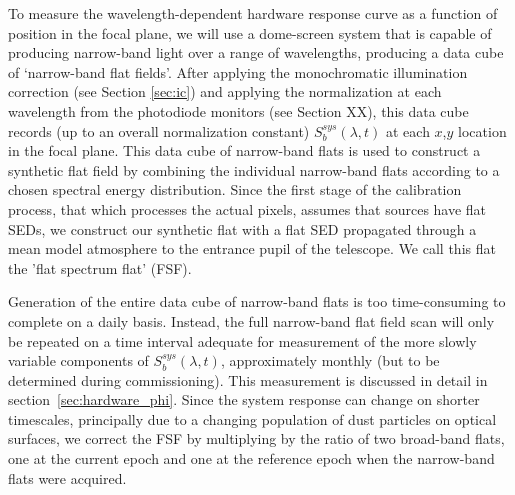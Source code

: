 \documentclass[12pt,preprint]{aastex}
\begin{document}


To measure the wavelength-dependent hardware response
curve as a function of position in the focal plane, we will use a
dome-screen system that is capable of producing narrow-band light 
over a range of wavelengths, producing a data cube of `narrow-band flat
fields'.  After applying the monochromatic illumination correction 
(see Section \ref{sec:ic}) and applying the normalization at each wavelength from
the photodiode monitors (see Section XX),  this data cube
records (up to an overall normalization constant) $S_b^{sys}(\lambda,t)$ at each $x$,$y$ location in the focal plane. 
This data cube of narrow-band
flats is used to construct a synthetic flat field by
combining the individual narrow-band flats according to a chosen
spectral energy distribution.  Since the first stage of the calibration process, that which
processes the actual pixels, assumes that sources have flat SEDs, we construct our synthetic flat
with a flat SED propagated through a mean model atmosphere to the entrance pupil of the
telescope.  We call this flat the 'flat spectrum flat' (FSF).

Generation of the entire data cube of
narrow-band flats is too time-consuming to complete on a daily
basis. Instead, the full narrow-band flat field scan will only be
repeated on a time interval adequate for measurement of
the more slowly variable components of $S_b^{sys}(\lambda,t)$, approximately
monthly (but to be determined during commissioning). This measurement
is discussed in detail in section~\ref{sec:hardware_phi}.  Since the system response can change 
on shorter timescales, principally due to a changing population of dust particles on optical surfaces, we correct the FSF
by multiplying by the ratio of two broad-band flats, one at the current epoch and one at the 
reference epoch when the narrow-band flats were acquired.
\end{document}
